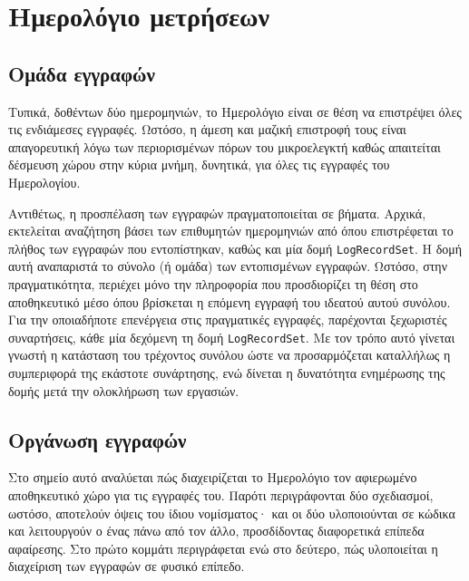 \section{Ημερολόγιο μετρήσεων}

\subsection{Ομάδα εγγραφών}
Τυπικά, δοθέντων δύο ημερομηνιών, το Ημερολόγιο είναι σε θέση να επιστρέψει όλες
τις ενδιάμεσες εγγραφές. Ωστόσο, η άμεση και μαζική επιστροφή τους είναι
απαγορευτική λόγω των περιορισμένων πόρων του μικροελεγκτή καθώς απαιτείται
δέσμευση χώρου στην κύρια μνήμη, δυνητικά, για όλες τις εγγραφές του
Ημερολογίου.
%

Αντιθέτως, η προσπέλαση των εγγραφών πραγματοποιείται σε βήματα. Αρχικά,
εκτελείται αναζήτηση βάσει των επιθυμητών ημερομηνιών από όπου επιστρέφεται το
πλήθος των εγγραφών που εντοπίστηκαν, καθώς και μία δομή \verb~LogRecordSet~. H
δομή αυτή αναπαριστά το σύνολο (ή ομάδα) των εντοπισμένων εγγραφών.
Ωστόσο, στην πραγματικότητα, περιέχει μόνο την πληροφορία που προσδιορίζει τη
θέση στο αποθηκευτικό μέσο όπου βρίσκεται η επόμενη εγγραφή του ιδεατού αυτού
συνόλου.
Για την οποιαδήποτε επενέργεια στις πραγματικές εγγραφές, παρέχονται ξεχωριστές
συναρτήσεις, κάθε μία δεχόμενη τη δομή \verb~LogRecordSet~. Με τον τρόπο αυτό
γίνεται γνωστή η κατάσταση του τρέχοντος συνόλου ώστε να προσαρμόζεται
καταλλήλως η συμπεριφορά της εκάστοτε συνάρτησης, ενώ δίνεται η δυνατότητα
ενημέρωσης της δομής μετά την ολοκλήρωση των εργασιών.

\subsection{Οργάνωση εγγραφών}

Στο σημείο αυτό αναλύεται πώς διαχειρίζεται το Ημερολόγιο τον αφιερωμένο
αποθηκευτικό χώρο για τις εγγραφές του. Παρότι περιγράφονται δύο σχεδιασμοί,
ωστόσο, αποτελούν όψεις του ίδιου νομίσματος· και οι δύο υλοποιούνται σε κώδικα
και λειτουργούν ο ένας πάνω από τον άλλο, προσδίδοντας διαφορετικά επίπεδα
αφαίρεσης. Στο πρώτο κομμάτι περιγράφεται  ενώ στο δεύτερο, πώς υλοποιείται η
διαχείριση των εγγραφών σε φυσικό επίπεδο.

